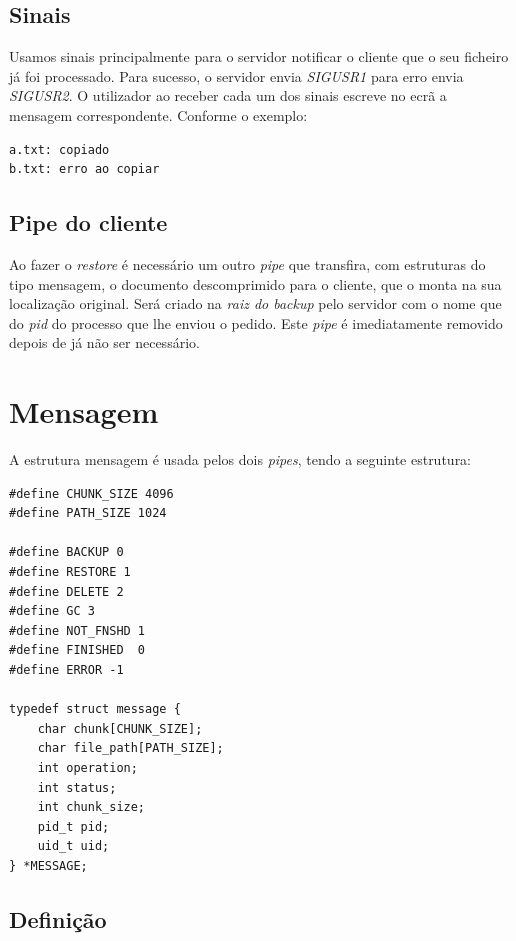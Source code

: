 \documentclass[12pt,a4paper]{report}
\begin{document}
\section{Sinais}
Usamos sinais principalmente para o servidor notificar o cliente que o seu ficheiro já foi processado. Para sucesso, o servidor envia \emph{SIGUSR1} para erro envia \emph{SIGUSR2}. O utilizador ao receber cada um dos sinais escreve no ecrã a mensagem correspondente. Conforme o exemplo:
\begin{lstlisting}
a.txt: copiado
b.txt: erro ao copiar
\end{lstlisting}

\section{Pipe do cliente}
Ao fazer o \emph{restore} é necessário um outro \emph{pipe} que transfira, com estruturas do tipo mensagem, o documento descomprimido para o cliente, que o monta na sua localização original. Será criado na \emph{raiz do backup} pelo servidor com o nome que do \emph{pid} do processo que lhe enviou o pedido. Este \emph{pipe} é imediatamente removido depois de já não ser necessário.  

\chapter{Mensagem}
A estrutura mensagem é usada pelos dois \emph{pipes}, tendo a seguinte estrutura:\par

\begin{lstlisting}
#define CHUNK_SIZE 4096
#define PATH_SIZE 1024

#define BACKUP 0
#define RESTORE 1
#define DELETE 2
#define GC 3
#define NOT_FNSHD 1
#define FINISHED  0 
#define ERROR -1

typedef struct message {
    char chunk[CHUNK_SIZE];
    char file_path[PATH_SIZE];
    int operation;
    int status;
    int chunk_size;
    pid_t pid;
    uid_t uid;
} *MESSAGE;
\end{lstlisting}

\section{Definição}
\end{document}
